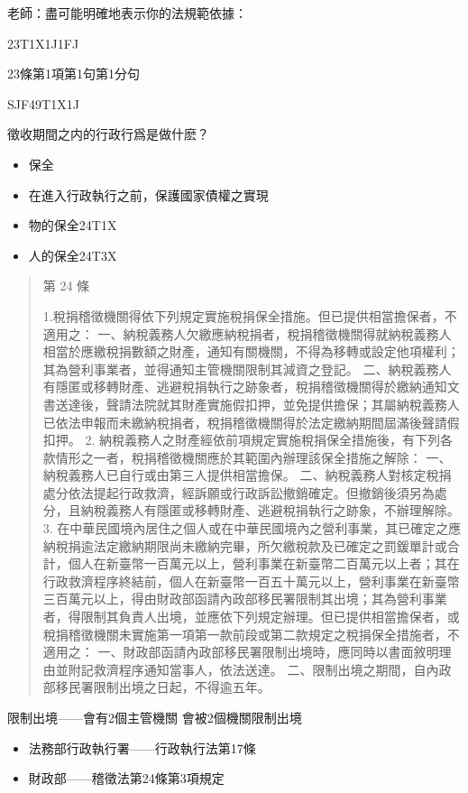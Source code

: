 \documentclass[]{ctexbook}
\providecommand{\tightlist}{%
  \setlength{\itemsep}{0pt}\setlength{\parskip}{0pt}}
\begin{document}
老師：盡可能明確地表示你的法規範依據：

23T1X1J1FJ

23條第1項第1句第1分句

SJF49T1X1J

徵收期間之内的行政行爲是做什麽？

\begin{itemize}
\tightlist
\item
  保全
\item
  在進入行政執行之前，保護國家債權之實現
\item
  物的保全24T1X
\item
  人的保全24T3X
\end{itemize}

\begin{quote}
第 24 條

1.稅捐稽徵機關得依下列規定實施稅捐保全措施。但已提供相當擔保者，不適用之：
一、納稅義務人欠繳應納稅捐者，稅捐稽徵機關得就納稅義務人相當於應繳稅捐數額之財產，通知有關機關，不得為移轉或設定他項權利；其為營利事業者，並得通知主管機關限制其減資之登記。
二、納稅義務人有隱匿或移轉財產、逃避稅捐執行之跡象者，稅捐稽徵機關得於繳納通知文書送達後，聲請法院就其財產實施假扣押，並免提供擔保；其屬納稅義務人已依法申報而未繳納稅捐者，稅捐稽徵機關得於法定繳納期間屆滿後聲請假扣押。
2. 納稅義務人之財產經依前項規定實施稅捐保全措施後，有下列各款情形之一者，稅捐稽徵機關應於其範圍內辦理該保全措施之解除：
一、納稅義務人已自行或由第三人提供相當擔保。
二、納稅義務人對核定稅捐處分依法提起行政救濟，經訴願或行政訴訟撤銷確定。但撤銷後須另為處分，且納稅義務人有隱匿或移轉財產、逃避稅捐執行之跡象，不辦理解除。
3. 在中華民國境內居住之個人或在中華民國境內之營利事業，其已確定之應納稅捐逾法定繳納期限尚未繳納完畢，所欠繳稅款及已確定之罰鍰單計或合計，個人在新臺幣一百萬元以上，營利事業在新臺幣二百萬元以上者；其在行政救濟程序終結前，個人在新臺幣一百五十萬元以上，營利事業在新臺幣三百萬元以上，得由財政部函請內政部移民署限制其出境；其為營利事業者，得限制其負責人出境，並應依下列規定辦理。但已提供相當擔保者，或稅捐稽徵機關未實施第一項第一款前段或第二款規定之稅捐保全措施者，不適用之：
一、財政部函請內政部移民署限制出境時，應同時以書面敘明理由並附記救濟程序通知當事人，依法送達。
二、限制出境之期間，自內政部移民署限制出境之日起，不得逾五年。
\end{quote}

限制出境------會有2個主管機關
會被2個機關限制出境

\begin{itemize}
\tightlist
\item
  法務部行政執行署------行政執行法第17條
\item
  財政部------稽徵法第24條第3項規定
\end{itemize}
\end{document}

